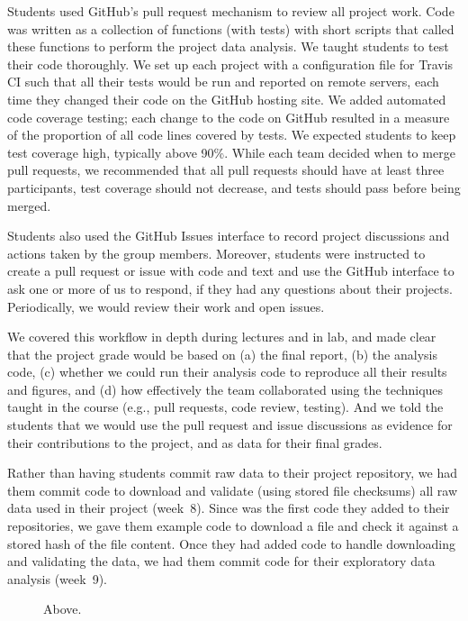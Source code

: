 Students used GitHub's pull request mechanism to review all project work.
Code was written as a collection of functions (with tests) with short
scripts that called these functions to perform the project data analysis.
We taught students to test their code thoroughly.
We set up each project with a configuration file for Travis CI
such that all their tests would be run and reported on remote servers, each
time they changed their code on the GitHub hosting site.
We added automated code coverage testing; each change to the code on GitHub
resulted in a measure of the proportion of all code lines covered by tests.
We expected students to keep test coverage high, typically above 90\%.
While each team decided when to merge pull requests, we recommended that
all pull requests should have at least three participants, test coverage
should not decrease, and tests should pass before being merged.

Students also used the GitHub Issues interface to record project discussions
and actions taken by the group members.
Moreover, students were instructed to create a pull request
or issue with code and text and use the GitHub interface to ask one or more
of us to respond, if they had any questions about their projects.
Periodically, we would review their work and open issues.

We covered this workflow in depth during lectures and in lab,
and made clear that the project grade would be based on
(a) the final report,
(b) the analysis code,
(c) whether we could run their analysis code to reproduce all
their results and figures, and
(d) how effectively the team collaborated using the techniques
taught in the course (e.g., pull requests, code review, testing).
And we told the students that we would use the pull request and issue
discussions as evidence for their contributions to the project, and as data for
their final grades.

Rather than having students commit raw data to their project repository, we had
them commit code to download and validate (using stored file checksums)
all raw data used in their project (week~8).
Since was the first code they added to their repositories, we gave them example
code to download a file and check it against a stored hash of the file
content.
Once they had added code to handle downloading and validating the data,
we had them commit code for their exploratory data analysis (week~9).

\begin{figure}
\centering
\begin{tiny}

\end{tiny}
\caption{Above.}\label{fig:progress}
\end{figure}

